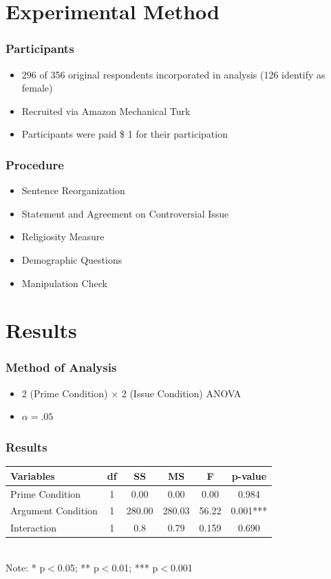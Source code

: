 \documentclass[14pt]{beamer}
\newcommand\tb{\textbf}
\begin{document}
\section{Experimental Method}

\begin{frame}
\frametitle{Participants}
\begin{itemize}
	\item 296 of 356 original respondents incorporated in analysis (126 identify as female)
	\item Recruited via Amazon Mechanical Turk
	\item Participants were paid \$ 1 for their participation
\end{itemize}
\end{frame}

\begin{frame}
\frametitle{Procedure}
\begin{itemize}
	\item Sentence Reorganization
	\item Statement and Agreement on Controversial Issue
	\item Religiosity Measure
	\item Demographic Questions
	\item Manipulation Check
\end{itemize}
\end{frame}

\section{Results}

\begin{frame}
\frametitle{Method of Analysis}
\begin{itemize}
	\item 2 (Prime Condition) $\times$ 2 (Issue Condition) ANOVA
	\item $\alpha = .05$
\end{itemize}
\end{frame}

\begin{frame}
\frametitle{Results}
\begin{table}
	\centering
	\small
	\begin{tabular}{lccccc}
		\hline
		\tb{Variables}&\tb{df}&\tb{SS}&\tb{MS}&\tb{F}&\tb{p-value}\\
		\hline
		Prime Condition&1&0.00&0.00&0.00&0.984\\
		Argument Condition&1&280.00&280.03&56.22&0.001***\\
		Interaction&1&0.8&0.79&0.159&0.690\\
		\hline
	\end{tabular}\\
Note: * p$<$0.05; ** p$<$0.01; *** p$<$0.001
\end{table}
\end{frame}
\end{document}
